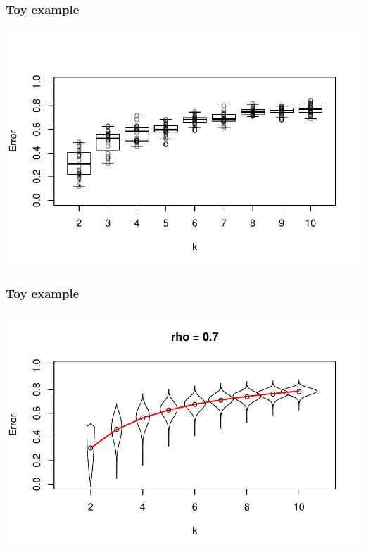 \documentclass{beamer}
\begin{document}
\begin{frame}
\frametitle{Toy example}
\begin{center}
\includegraphics[scale = 0.5]{../extrapolation/autoplots/all_box.pdf}
\end{center}
\end{frame}

\begin{frame}
\frametitle{Toy example}
\begin{center}
\includegraphics[scale = 0.5]{../extrapolation/illus_err_0_7.pdf}
\end{center}
\end{frame}
\end{document}
